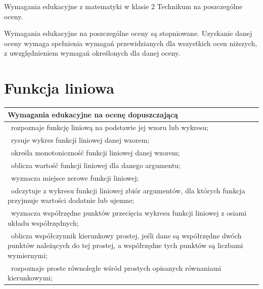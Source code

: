 \documentclass[12pt,a4paper]{article}
\begin{document}
	
	\begin{center}
		\Large Wymagania edukacyjne z matematyki w klasie 2 Technikum na poszczególne oceny.
	\end{center}
	
	Wymagania edukacyjne na poszczególne oceny są stopniowane.
	Uzyskanie danej oceny wymaga spełnienia wymagań przewidzianych
	dla wszystkich ocen niższych, z uwzględnieniem wymagań
	określonych dla danej oceny.
	
	\section{Funkcja liniowa}
	
	\begin{longtable}{|p{16cm}|}
		\hline
		
		\textbf{Wymagania edukacyjne na ocenę dopuszczającą} \\ \hline
		
		\textbullet\ rozpoznaje funkcję liniową na podstawie jej wzoru lub wykresu; \\
		
		\textbullet\ rysuje wykres funkcji liniowej danej wzorem; \\
		
		\textbullet\ określa monotoniczność funkcji liniowej danej wzorem; \\
		
		\textbullet\ oblicza wartość funkcji liniowej dla danego argumentu; \\
		
		\textbullet\ wyznacza miejsce zerowe funkcji liniowej; \\
		
		\textbullet\ odczytuje z wykresu funkcji liniowej zbiór argumentów, dla których funkcja przyjmuje wartości dodatnie lub ujemne; \\
		
		\textbullet\ wyznacza współrzędne punktów przecięcia wykresu funkcji liniowej z osiami układu współrzędnych; \\
		
		\textbullet\ oblicza współczynnik kierunkowy prostej, jeśli dane są współrzędne dwóch punktów należących do tej prostej, a współrzędne tych punktów są liczbami wymiernymi; \\
		
		\textbullet\ rozpoznaje proste równoległe wśród prostych opisanych równaniami kierunkowymi; \\
		

\end{longtable}
\end{document}
